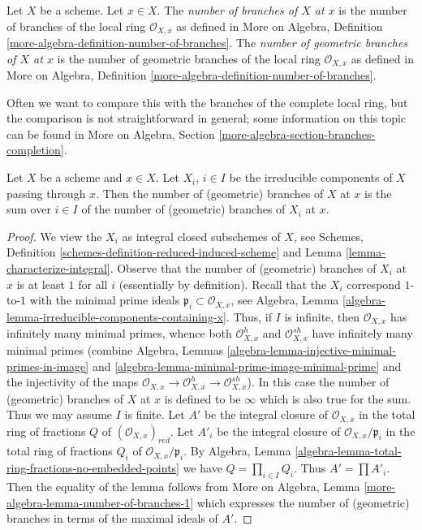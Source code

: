 \begin{definition}
\label{definition-number-of-branches}
Let $X$ be a scheme. Let $x \in X$. The {\it number of branches of $X$
at $x$} is the number of branches of the local ring $\mathcal{O}_{X, x}$
as defined in
More on Algebra, Definition \ref{more-algebra-definition-number-of-branches}.
The {\it number of geometric branches of $X$ at $x$} is the number of
geometric branches of the local ring $\mathcal{O}_{X, x}$ as defined in
More on Algebra, Definition \ref{more-algebra-definition-number-of-branches}.
\end{definition}

\noindent
Often we want to compare this with the branches of the complete local
ring, but the comparison is not straightforward in general; some information
on this topic can be found in More on Algebra, Section
\ref{more-algebra-section-branches-completion}.

\begin{lemma}
\label{lemma-number-of-branches-irreducible-components}
Let $X$ be a scheme and $x \in X$. Let $X_i$, $i \in I$ be the
irreducible components of $X$ passing through $x$.
Then the number of (geometric) branches of $X$ at $x$
is the sum over $i \in I$ of the number of (geometric)
branches of $X_i$ at $x$.
\end{lemma}

\begin{proof}
We view the $X_i$ as integral closed subschemes of $X$, see
Schemes, Definition \ref{schemes-definition-reduced-induced-scheme} and
Lemma \ref{lemma-characterize-integral}.
Observe that the number of (geometric) branches of $X_i$ at $x$
is at least $1$ for all $i$ (essentially by definition).
Recall that the $X_i$ correspond $1$-to-$1$ with the minimal
prime ideals $\mathfrak p_i \subset \mathcal{O}_{X, x}$, see
Algebra, Lemma \ref{algebra-lemma-irreducible-components-containing-x}.
Thus, if $I$ is infinite, then $\mathcal{O}_{X, x}$ has infinitely
many minimal primes, whence both $\mathcal{O}_{X, x}^h$
and $\mathcal{O}_{X, x}^{sh}$ have infinitely many minimal
primes (combine Algebra, Lemmas
\ref{algebra-lemma-injective-minimal-primes-in-image} and
\ref{algebra-lemma-minimal-prime-image-minimal-prime} and
the injectivity of the maps
$\mathcal{O}_{X, x} \to  \mathcal{O}_{X, x}^h \to \mathcal{O}_{X, x}^{sh}$).
In this case the number of (geometric) branches of $X$ at $x$
is defined to be $\infty$ which is also true for the sum.
Thus we may assume $I$ is finite.
Let $A'$ be the integral closure of $\mathcal{O}_{X, x}$
in the total ring of fractions $Q$ of $(\mathcal{O}_{X, x})_{red}$.
Let $A'_i$ be the  integral closure of $\mathcal{O}_{X, x}/\mathfrak p_i$
in the total ring of fractions $Q_i$ of $\mathcal{O}_{X, x}/\mathfrak p_i$.
By Algebra, Lemma \ref{algebra-lemma-total-ring-fractions-no-embedded-points}
we have $Q = \prod_{i \in I} Q_i$. Thus $A' = \prod A'_i$.
Then the equality of the lemma follows from
More on Algebra, Lemma \ref{more-algebra-lemma-number-of-branches-1}
which expresses the number of (geometric) branches in terms
of the maximal ideals of $A'$.
\end{proof}

